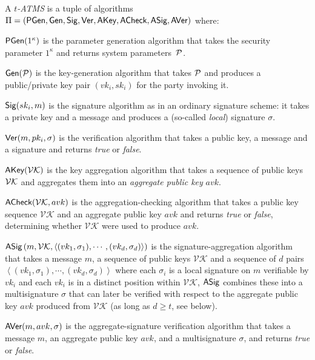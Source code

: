 \begin{definition}
  A \textit{$t$-ATMS} is a tuple of algorithms
  $\Pi = (
    \textsf{PGen},\allowbreak
    \mathsf{Gen},\allowbreak
    \mathsf{Sig},\allowbreak
    \mathsf{Ver},\allowbreak
    \textsf{AKey},\allowbreak
    \textsf{ACheck},\allowbreak
    \textsf{ASig},\allowbreak
    \textsf{AVer}
  )$
  where:
  \begin{description}
  \item $\textsf{PGen}(1^\kappa)$
     is the parameter generation algorithm that takes the security parameter
     $1^\kappa$ and returns system parameters~$\mathcal{P}$.
   \item $\mathsf{Gen}(\mathcal{P})$
     is the key-generation algorithm that takes $\mathcal{P}$ and produces a
     public/private key pair $(vk_i, sk_i)$ for the party invoking it.
   \item $\mathsf{Sig}(sk_i,m)$
    is the signature algorithm as in an ordinary signature scheme: it takes a private
    key and a message and produces a (so-called \emph{local}) signature $\sigma$.
   \item $\mathsf{Ver}(m, pk_i, \sigma)$
    is the verification algorithm that takes a public key, a message and a
    signature and returns \emph{true} or \emph{false}.
   \item $\textsf{AKey}(\mathcal{VK})$
    is the key aggregation algorithm that takes a sequence of public keys $\mathcal{VK}$
    and aggregates them into an \emph{aggregate public key} $avk$.
  \item $\textsf{ACheck}(\mathcal{VK},avk)$
    is the aggregation-checking algorithm that takes a public key sequence
    $\mathcal{VK}$ and an aggregate public key $avk$ and returns \emph{true} or
    \emph{false}, determining whether $\mathcal{VK}$ were used to produce $avk$.
  \item $\textsf{ASig}\left(m,\mathcal{VK},\left<(vk_1,\sigma_1),\cdots, (vk_d, \sigma_d)\right>\right)$
    is the signature-aggregation algorithm that takes a message $m$, a sequence of
    public keys $\mathcal{VK}$ and a sequence of $d$ pairs $\left<(vk_1,\sigma_1), \cdots, (vk_d, \sigma_d)\right>$
    where each $\sigma_i$ is a local signature on $m$ verifiable by $vk_i$ and
    each $vk_i$ is in a distinct position within $\mathcal{VK}$, $\textsf{ASig}$
    combines these into a multisignature $\sigma$ that can later be verified with
    respect to the aggregate public key $avk$ produced from $\mathcal{VK}$ (as
    long as $d \geq t$, see below).
  \item $\textsf{AVer}(m,avk,\sigma)$
    is the aggregate-signature verification algorithm that takes
    a message $m$, an aggregate public key $avk$, and a multisignature $\sigma$,
    and returns \emph{true} or \emph{false}.
  \end{description}
\end{definition}

